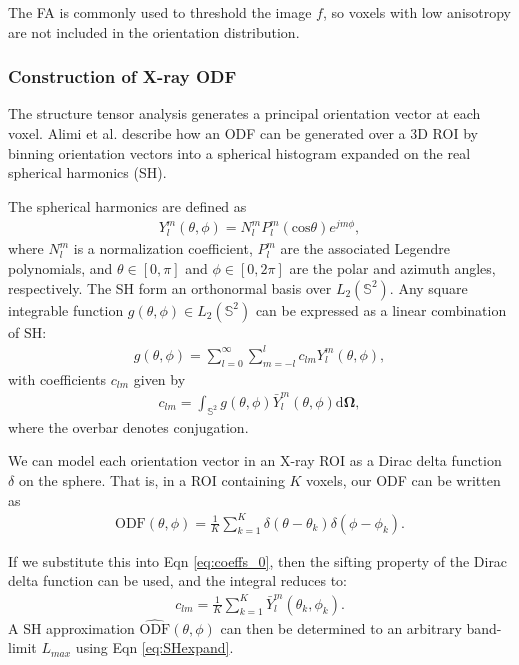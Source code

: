 \documentclass[11pt]{article}
\begin{document}
The FA is commonly used to threshold the image $f$, so voxels with low
anisotropy are not included in the orientation distribution.

\subsubsection{Construction of X-ray ODF}\label{alimi}
The structure tensor analysis generates a principal orientation vector at each
voxel. Alimi et al. \cite{Alimi2018} describe how an ODF can be generated over a
3D ROI by binning orientation vectors into a spherical histogram
expanded on the real spherical harmonics (SH).


The spherical harmonics are defined as
\begin{align}
  Y_l^m(\theta, \phi) = N_l^m P_l^m(\text{cos}\theta)e^{jm\phi},
\end{align}
where $N_l^m$ is a normalization coefficient, $P_l^m$ are the
associated Legendre polynomials, and $\theta \in [0, \pi]$ and $\phi \in [0, 2\pi]$
are the polar and azimuth angles, respectively. 
The SH form an orthonormal basis over $L_2(\mathbb{S}^2)$. Any
square integrable function $g(\theta, \phi) \in L_2(\mathbb{S}^2)$ can
be expressed as a linear combination of SH:
\begin{align}
  g(\theta, \phi) = \sum_{l=0}^{\infty}\sum_{m=-l}^l c_{lm}Y_l^m(\theta, \phi),
  \label{eq:SHexpand}
\end{align}
with coefficients $c_{lm}$ given by
\begin{align}
  c_{lm} = \int_{\mathbb{S}^2} g(\theta, \phi) \bar{Y}_l^m(\theta, \phi) \mathrm{d}\bm{\Omega},
  \label{eq:coeffs_0}
\end{align}
where the overbar denotes conjugation.

We can model each orientation vector in an X-ray ROI as a Dirac delta function
$\delta$ on the sphere. That is, in a ROI containing $K$ voxels, our ODF
can be written as
\begin{align}
  \text{ODF}(\theta, \phi) = \frac{1}{K}\sum_{k=1}^K \delta(\theta - \theta_k)\delta(\phi - \phi_k).
\end{align}

If we substitute this into Eqn \ref{eq:coeffs_0}, then the sifting property of the Dirac
delta function can be used, and the integral reduces to:
\begin{align}
  c_{lm} = \frac{1}{K}\sum_{k=1}^K \bar{Y}_l^m(\theta_k, \phi_k).
  \label{eq:get_coeffs}
\end{align}
A SH approximation $\hat{\text{ODF}}(\theta, \phi)$ can then be determined to an arbitrary
band-limit $L_{max}$ using Eqn \ref{eq:SHexpand}.
\end{document}
